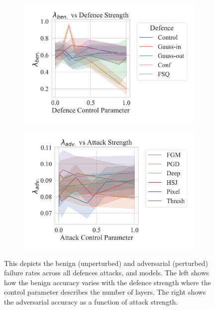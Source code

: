 \begin{figure}
    \centering
    \begin{subfigure}[]{0.45\textwidth}
        \centering
        \includegraphics[width=\textwidth]{mnist/def_param_vs_accuracy.pdf}
    \end{subfigure}
    \begin{subfigure}[]{0.45\textwidth}
        \centering
        \includegraphics[width=\textwidth]{mnist/atk_param_vs_accuracy.pdf}
    \end{subfigure}
    \caption{This depicts the benign (unperturbed) and adversarial (perturbed) failure rates across all defences attacks, and models. The left shows how the benign accuracy varies with the defence strength where the control parameter describes the number of layers. The right shows the adversarial accuracy as a function of attack strength.}
    \label{fig:mnist_strength}
\end{figure}

